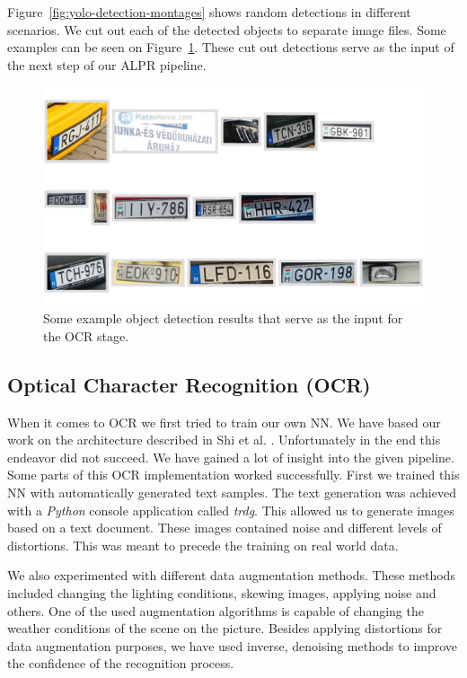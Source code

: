 Figure~\ref{fig:yolo-detection-montages}  shows random detections in different
scenarios. We cut out each of the detected objects to separate image files. Some
examples can be seen on Figure~\ref{fig:cutout-montage}.
These cut out detections serve as the input of the next step of our \ac{ALPR}
pipeline.
\begin{figure}
    \includegraphics[width=\textwidth]{figures/yolo/cutout_montage.jpg}
    \caption{Some example object detection results that serve as the
    input for the OCR stage.}
    \label{fig:cutout-montage}
\end{figure}

\subsection{Optical Character Recognition (OCR)}

When it comes to \ac{OCR} we first tried to train our own \ac{NN}.  We have
based our work on the architecture described in Shi et al. \cite{7801919}.
Unfortunately in the end this endeavor did not succeed.  We have gained a lot
of insight into the given pipeline.  Some parts of this \ac{OCR} implementation
worked successfully.  First we trained this \ac{NN} with automatically generated
text samples.  The text generation was achieved with a \emph{Python} console
application called \emph{trdg}.  This allowed us to generate images based on
a text document.  These images contained noise and different levels of
distortions.  This was meant to precede the training on real world data.

We also experimented with different data augmentation methods.  These methods
included changing the lighting conditions, skewing images, applying noise and
others.  One of the used augmentation algorithms is capable of changing the
weather conditions of the scene on the picture.  Besides applying distortions
for data augmentation purposes, we have used inverse, denoising methods to
improve the confidence of the recognition process.

